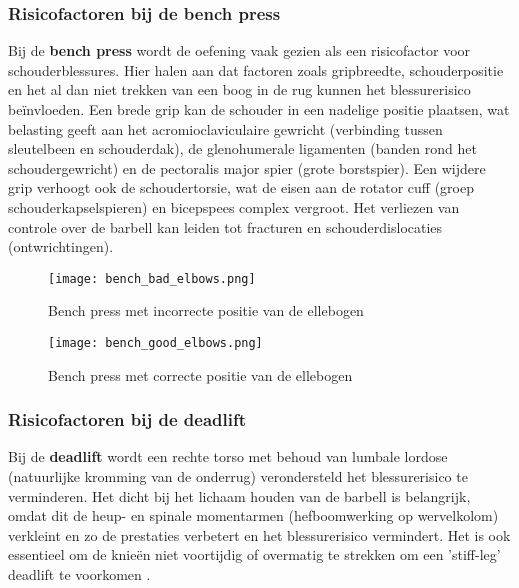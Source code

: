 \subsubsection{Risicofactoren bij de bench press}
\label{subsubsec:risicofactoren-bench-press}
Bij de \textbf{bench press} wordt de oefening vaak gezien als een risicofactor voor schouderblessures. 
Hier halen \textcite{BengtssonEtAl2018} aan dat factoren zoals gripbreedte, schouderpositie en het al dan niet trekken van een boog in de rug kunnen het blessurerisico beïnvloeden. 
Een brede grip kan de schouder in een nadelige positie plaatsen, wat belasting geeft aan het acromioclaviculaire gewricht (verbinding tussen sleutelbeen en schouderdak), de glenohumerale ligamenten (banden rond het schoudergewricht) en de pectoralis major spier (grote borstspier). 
Een wijdere grip verhoogt ook de schoudertorsie, wat de eisen aan de rotator cuff (groep schouderkapselspieren) en bicepspees complex vergroot. 
Het verliezen van controle over de barbell kan leiden tot fracturen en schouderdislocaties (ontwrichtingen).

\begin{figure}[h]
  \centering
  \begin{minipage}{0.45\textwidth}
      \centering
      \texttt{[image: bench\_bad\_elbows.png]}
      \caption[Figuur 1]{\label{fig:bench_incorrect}Bench press met incorrecte positie van de ellebogen \autocite{Ronai2018}}
  \end{minipage}
  \hfill %
  \begin{minipage}{0.45\textwidth}
      \centering
      \texttt{[image: bench\_good\_elbows.png]}
      \caption[Figuur 2]{\label{fig:bench_correct}Bench press met correcte positie van de ellebogen \autocite{Ronai2018}}
  \end{minipage}
\end{figure}    

\subsubsection{Risicofactoren bij de deadlift}
\label{subsubsec:risicofactoren-deadlift}
Bij de \textbf{deadlift} wordt een rechte torso met behoud van lumbale lordose (natuurlijke kromming van de onderrug) verondersteld het blessurerisico te verminderen. 
Het dicht bij het lichaam houden van de barbell is belangrijk, omdat dit de heup- en spinale momentarmen (hefboomwerking op wervelkolom) verkleint en zo de prestaties verbetert en het blessurerisico vermindert. 
Het is ook essentieel om de knieën niet voortijdig of overmatig te strekken om een 'stiff-leg' deadlift te voorkomen \autocite{BengtssonEtAl2018}.

